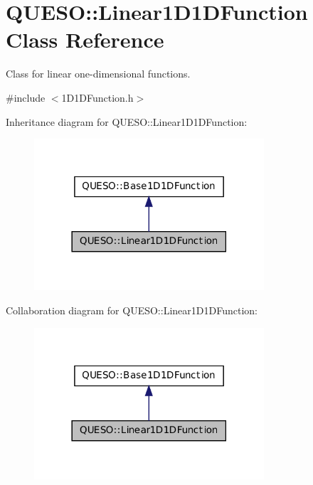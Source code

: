 \hypertarget{class_q_u_e_s_o_1_1_linear1_d1_d_function}{\section{Q\-U\-E\-S\-O\-:\-:Linear1\-D1\-D\-Function Class Reference}
\label{class_q_u_e_s_o_1_1_linear1_d1_d_function}
}


Class for linear one-\/dimensional functions.  




{\ttfamily \#include $<$1\-D1\-D\-Function.\-h$>$}



Inheritance diagram for Q\-U\-E\-S\-O\-:\-:Linear1\-D1\-D\-Function\-:
\nopagebreak
\begin{figure}[H]
\begin{center}
\leavevmode
\includegraphics[width=242pt]{class_q_u_e_s_o_1_1_linear1_d1_d_function__inherit__graph}
\end{center}
\end{figure}


Collaboration diagram for Q\-U\-E\-S\-O\-:\-:Linear1\-D1\-D\-Function\-:
\nopagebreak
\begin{figure}[H]
\begin{center}
\leavevmode
\includegraphics[width=242pt]{class_q_u_e_s_o_1_1_linear1_d1_d_function__coll__graph}
\end{center}
\end{figure}
